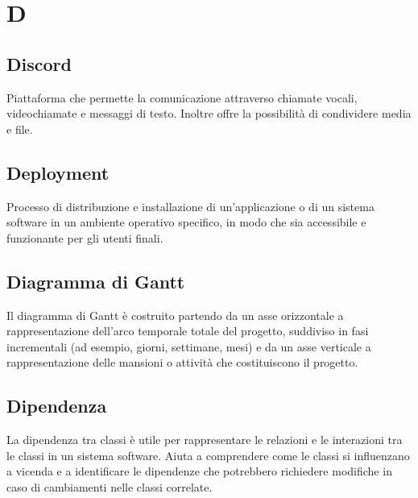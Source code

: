 \section{D}
\subsection{Discord}%
Piattaforma che permette la comunicazione attraverso chiamate vocali, videochiamate e messaggi di testo.  Inoltre offre la possibilità di condividere media e file.

\subsection{Deployment}
Processo di distribuzione e installazione di un'applicazione o di un sistema software in un ambiente operativo specifico, in modo che sia accessibile e funzionante per gli utenti finali.

\subsection{Diagramma di Gantt}%
Il diagramma di Gantt è costruito partendo da un asse orizzontale a rappresentazione dell'arco temporale totale del progetto, suddiviso in fasi incrementali (ad esempio, giorni, settimane, mesi) e da un asse verticale a rappresentazione delle mansioni o attività che costituiscono il progetto.

\subsection{Dipendenza} 
La dipendenza tra classi è utile per rappresentare le relazioni e le interazioni tra le classi in un sistema software. Aiuta a comprendere come le classi si influenzano a vicenda e a identificare le dipendenze che potrebbero richiedere modifiche in caso di cambiamenti nelle classi correlate.
\clearpage